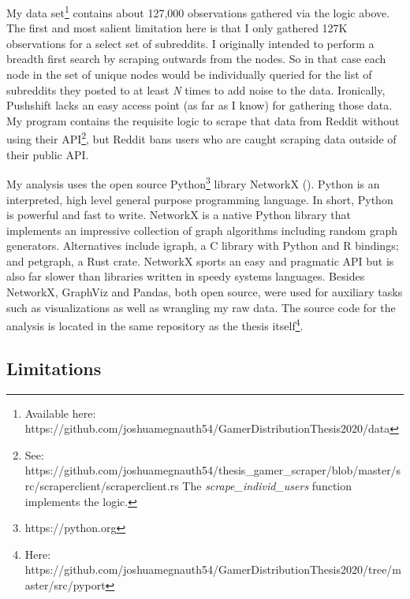 \documentclass[12pt, a4paper]{article}
\begin{document}
My data set\footnote{Available here: https://github.com/joshuamegnauth54/GamerDistributionThesis2020/data} contains about 127,000 observations gathered via the logic above. The first and most salient limitation here is that I only gathered 127K observations for a select set of subreddits. I originally intended to perform a breadth first search by scraping outwards from the nodes. So in that case each node in the set of unique nodes would be individually queried for the list of subreddits they posted to at least \textit{N} times to add noise to the data. Ironically, Pushshift lacks an easy access point (as far as I know) for gathering those data. My program contains the requisite logic to scrape that data from Reddit without using their API\footnote{See: https://github.com/joshuamegnauth54/thesis\_gamer\_scraper/blob/master/src/scraperclient/scraperclient.rs The \textit{scrape\_individ\_users} function implements the logic.}, but Reddit bans users who are caught scraping data outside of their public API.

My analysis uses the open source Python\footnote{https://python.org} library NetworkX (\cite{networkx}). Python is an interpreted, high level general purpose programming language. In short, Python is powerful and fast to write. NetworkX is a native Python library that implements an impressive collection of graph algorithms including random graph generators. Alternatives include igraph, a C library with Python and R bindings; and petgraph, a Rust crate. NetworkX sports an easy and pragmatic API but is also far slower than libraries written in speedy systems languages. Besides NetworkX, GraphViz and Pandas, both open source, were used for auxiliary tasks such as visualizations as well as wrangling my raw data. The source code for the analysis is located in the same repository as the thesis itself\footnote{Here: https://github.com/joshuamegnauth54/GamerDistributionThesis2020/tree/master/src/pyport}.

\subsection{Limitations}
\end{document}
